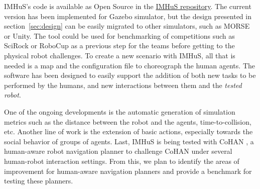 IMHuS's code is available as Open Source in the  \href{https://github.com/LAAS-HRI/IMHuS}{IMHuS repository}. The current version has been implemented for Gazebo simulator, but the design presented in section~\ref{sec:design} can be easily migrated to other simulators, such as MORSE or Unity. The tool could be used for benchmarking of competitions such as SciRock or RoboCup as a previous step for the teams before getting to the physical robot challenges. To create a new scenario with IMHuS, all that is needed is a map and the configuration file to choreograph the human agents. The software has been designed to easily support the addition of both new tasks to be performed by the humans, and new interactions between them and the \textit{tested robot}.

One of the ongoing developments is the automatic generation of simulation metrics such as the distance between the robot and the agents, time-to-collision, etc. Another line of work is the extension of basic actions, especially towards the social behavior of groups of agents. Last, IMHuS is being tested with CoHAN \cite{singamaneni2021human}, a human-aware robot navigation planner to challenge CoHAN under several human-robot interaction settings. From this, we plan to identify the areas of improvement for human-aware navigation planners and provide a benchmark for testing these planners.

